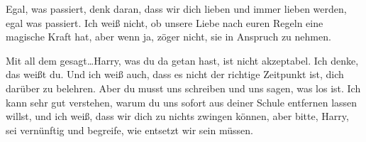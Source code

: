 \begin{writtenNote}
Egal, was passiert, denk daran, dass wir dich lieben und immer lieben werden, egal was passiert. Ich weiß nicht, ob unsere Liebe nach euren Regeln eine magische Kraft hat, aber wenn ja, zöger nicht, sie in Anspruch zu nehmen.

Mit all dem gesagt…Harry, was du da getan hast, ist nicht akzeptabel. Ich denke, das weißt du. Und ich weiß auch, dass es nicht der richtige Zeitpunkt ist, dich darüber zu belehren. Aber du musst uns schreiben und uns sagen, was los ist. Ich kann sehr gut verstehen, warum du uns sofort aus deiner Schule entfernen lassen willst, und ich weiß, dass wir dich zu nichts zwingen können, aber bitte, Harry, sei vernünftig und begreife, wie entsetzt wir sein müssen.


\end{writtenNote}
